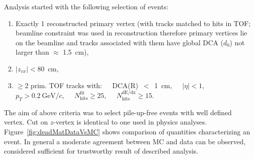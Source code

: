 Analysis started with the following selection of events:\vspace{-5pt}
\begin{enumerate}
 \item Exactly 1 reconstructed primary vertex (with tracks matched to hits in TOF; beamline constraint was used in reconstruction therefore primary vertices lie on the beamline and tracks associated with them have global DCA ($d_{0}$) not larger than $\approx$ 1.5~cm),\vspace{-5pt}
 \item $|z_{vx}|<80$~cm\vspace{-5pt},
 \item $\geq$2 prim. TOF tracks with:~~~DCA(R)~$<$~1~cm,~~~$|\eta|<1$,~~~$p_{T}>0.2~\text{GeV}/c$,~~~$N_{\textrm{hits}}^{\textrm{fit}}\geq25$,~~~$N_{\textrm{hits}}^{\textrm{dE/dx}}\geq15$.%
\end{enumerate}%
The aim of above criteria was to select pile-up-free events with well defined vertex. Cut on $z$-vertex is identical to one used in physics analyses. Figure~\ref{fig:deadMatDataVsMC} shows comparison of quantities characterizing an event. In general a moderate agreement between MC and data can be observed, considered sufficient for trustworthy result of described analysis.
